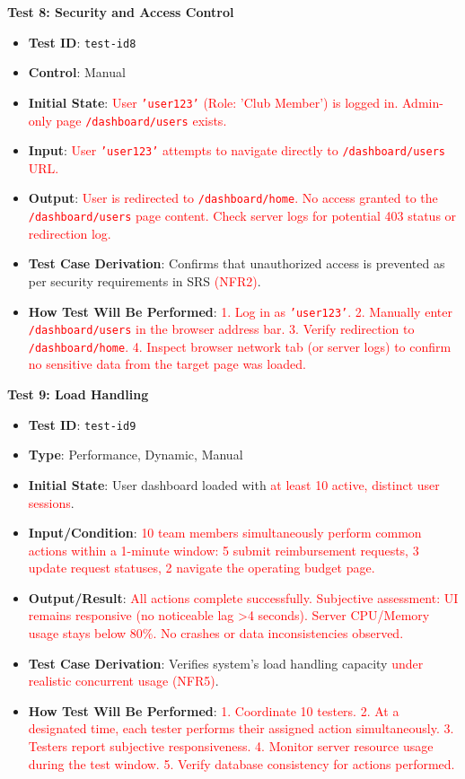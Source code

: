 \documentclass[12pt, titlepage]{article}
\begin{document}
\textbf{Test 8: Security and Access Control} \label{test-id8}
\begin{itemize}
    \item \textbf{Test ID}: \texttt{test-id8}
    \item \textbf{Control}: Manual
    \item \textbf{Initial State}: \textcolor{red}{User \texttt{'user123'} (Role: 'Club Member') is logged in. Admin-only page \texttt{/dashboard/users} exists.}
    \item \textbf{Input}: \textcolor{red}{User \texttt{'user123'} attempts to navigate directly to \texttt{/dashboard/users} URL.}
    \item \textbf{Output}: \textcolor{red}{User is redirected to \texttt{/dashboard/home}. No access granted to the \texttt{/dashboard/users} page content. Check server logs for potential 403 status or redirection log.}
    \item \textbf{Test Case Derivation}: Confirms that unauthorized access is prevented as per security requirements in SRS \textcolor{red}{(NFR2)}.
    \item \textbf{How Test Will Be Performed}: \textcolor{red}{1. Log in as \texttt{'user123'}. 2. Manually enter \texttt{/dashboard/users} in the browser address bar. 3. Verify redirection to \texttt{/dashboard/home}. 4. Inspect browser network tab (or server logs) to confirm no sensitive data from the target page was loaded.}
\end{itemize}

\textbf{Test 9: Load Handling} \label{test-id9}
\begin{itemize}
    \item \textbf{Test ID}: \texttt{test-id9}
    \item \textbf{Type}: Performance, Dynamic, Manual
    \item \textbf{Initial State}: User dashboard loaded with \textcolor{red}{at least 10 active, distinct user sessions}.
    \item \textbf{Input/Condition}: \textcolor{red}{10 team members simultaneously perform common actions within a 1-minute window: 5 submit reimbursement requests, 3 update request statuses, 2 navigate the operating budget page.}
    \item \textbf{Output/Result}: \textcolor{red}{All actions complete successfully. Subjective assessment: UI remains responsive (no noticeable lag \textgreater 4 seconds). Server CPU/Memory usage stays below 80\%. No crashes or data inconsistencies observed.}
    \item \textbf{Test Case Derivation}: Verifies system’s load handling capacity \textcolor{red}{under realistic concurrent usage (NFR5)}.
    \item \textbf{How Test Will Be Performed}: \textcolor{red}{1. Coordinate 10 testers. 2. At a designated time, each tester performs their assigned action simultaneously. 3. Testers report subjective responsiveness. 4. Monitor server resource usage during the test window. 5. Verify database consistency for actions performed.}
\end{itemize}
\end{document}
